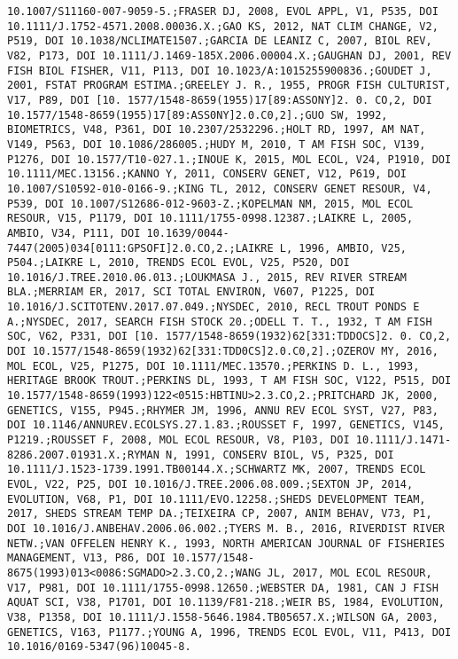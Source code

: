 \documentclass[]{article}
\begin{document}
\begin{verbatim}
10.1007/S11160-007-9059-5.;FRASER DJ, 2008, EVOL APPL, V1, P535, DOI 10.1111/J.1752-4571.2008.00036.X.;GAO KS, 2012, NAT CLIM CHANGE, V2, P519, DOI 10.1038/NCLIMATE1507.;GARCIA DE LEANIZ C, 2007, BIOL REV, V82, P173, DOI 10.1111/J.1469-185X.2006.00004.X.;GAUGHAN DJ, 2001, REV FISH BIOL FISHER, V11, P113, DOI 10.1023/A:1015255900836.;GOUDET J, 2001, FSTAT PROGRAM ESTIMA.;GREELEY J. R., 1955, PROGR FISH CULTURIST, V17, P89, DOI [10. 1577/1548-8659(1955)17[89:ASSONY]2. 0. CO,2, DOI 10.1577/1548-8659(1955)17[89:ASS0NY]2.0.C0,2].;GUO SW, 1992, BIOMETRICS, V48, P361, DOI 10.2307/2532296.;HOLT RD, 1997, AM NAT, V149, P563, DOI 10.1086/286005.;HUDY M, 2010, T AM FISH SOC, V139, P1276, DOI 10.1577/T10-027.1.;INOUE K, 2015, MOL ECOL, V24, P1910, DOI 10.1111/MEC.13156.;KANNO Y, 2011, CONSERV GENET, V12, P619, DOI 10.1007/S10592-010-0166-9.;KING TL, 2012, CONSERV GENET RESOUR, V4, P539, DOI 10.1007/S12686-012-9603-Z.;KOPELMAN NM, 2015, MOL ECOL RESOUR, V15, P1179, DOI 10.1111/1755-0998.12387.;LAIKRE L, 2005, AMBIO, V34, P111, DOI 10.1639/0044-7447(2005)034[0111:GPSOFI]2.0.CO,2.;LAIKRE L, 1996, AMBIO, V25, P504.;LAIKRE L, 2010, TRENDS ECOL EVOL, V25, P520, DOI 10.1016/J.TREE.2010.06.013.;LOUKMASA J., 2015, REV RIVER STREAM BLA.;MERRIAM ER, 2017, SCI TOTAL ENVIRON, V607, P1225, DOI 10.1016/J.SCITOTENV.2017.07.049.;NYSDEC, 2010, RECL TROUT PONDS E A.;NYSDEC, 2017, SEARCH FISH STOCK 20.;ODELL T. T., 1932, T AM FISH SOC, V62, P331, DOI [10. 1577/1548-8659(1932)62[331:TDDOCS]2. 0. CO,2, DOI 10.1577/1548-8659(1932)62[331:TDD0CS]2.0.C0,2].;OZEROV MY, 2016, MOL ECOL, V25, P1275, DOI 10.1111/MEC.13570.;PERKINS D. L., 1993, HERITAGE BROOK TROUT.;PERKINS DL, 1993, T AM FISH SOC, V122, P515, DOI 10.1577/1548-8659(1993)122<0515:HBTINU>2.3.CO,2.;PRITCHARD JK, 2000, GENETICS, V155, P945.;RHYMER JM, 1996, ANNU REV ECOL SYST, V27, P83, DOI 10.1146/ANNUREV.ECOLSYS.27.1.83.;ROUSSET F, 1997, GENETICS, V145, P1219.;ROUSSET F, 2008, MOL ECOL RESOUR, V8, P103, DOI 10.1111/J.1471-8286.2007.01931.X.;RYMAN N, 1991, CONSERV BIOL, V5, P325, DOI 10.1111/J.1523-1739.1991.TB00144.X.;SCHWARTZ MK, 2007, TRENDS ECOL EVOL, V22, P25, DOI 10.1016/J.TREE.2006.08.009.;SEXTON JP, 2014, EVOLUTION, V68, P1, DOI 10.1111/EVO.12258.;SHEDS DEVELOPMENT TEAM, 2017, SHEDS STREAM TEMP DA.;TEIXEIRA CP, 2007, ANIM BEHAV, V73, P1, DOI 10.1016/J.ANBEHAV.2006.06.002.;TYERS M. B., 2016, RIVERDIST RIVER NETW.;VAN OFFELEN HENRY K., 1993, NORTH AMERICAN JOURNAL OF FISHERIES MANAGEMENT, V13, P86, DOI 10.1577/1548-8675(1993)013<0086:SGMADO>2.3.CO,2.;WANG JL, 2017, MOL ECOL RESOUR, V17, P981, DOI 10.1111/1755-0998.12650.;WEBSTER DA, 1981, CAN J FISH AQUAT SCI, V38, P1701, DOI 10.1139/F81-218.;WEIR BS, 1984, EVOLUTION, V38, P1358, DOI 10.1111/J.1558-5646.1984.TB05657.X.;WILSON GA, 2003, GENETICS, V163, P1177.;YOUNG A, 1996, TRENDS ECOL EVOL, V11, P413, DOI 10.1016/0169-5347(96)10045-8.

\end{verbatim}
\end{document}
